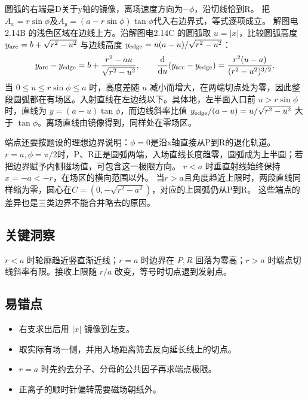 \documentclass[UTF8,fontset=fandol,a4paper,11pt]{ctexart}
\newcommand{\dd}{\mathop{}\!\mathrm{d}}
\begin{document}
圆弧的右端是D关于y轴的镜像，离场速度方向为$-\phi$，沿切线恰到R。
把$A_x=r\sin\phi$及$A_y=(a-r\sin\phi)\tan\phi$代入右边界式，等式逐项成立。
解图电2.14B 的浅色区域在边线上方。沿解图电2.14C 的圆弧取 $u=|x|$，比较圆弧高度 $y_{\rm arc}=b+\sqrt{r^2-u^2}$ 与边线高度 $y_{\rm edge}=u(a-u)/\sqrt{r^2-u^2}$：
\[
y_{\rm arc}-y_{\rm edge}=b+\frac{r^2-au}{\sqrt{r^2-u^2}},
\qquad
\frac{\dd}{\dd u}(y_{\rm arc}-y_{\rm edge})
=\frac{r^2(u-a)}{(r^2-u^2)^{3/2}}.
\]
当 $0\le u\le r\sin\phi\le a$ 时，高度差随 $u$ 减小而增大，在两端切点处为零，因此整段圆弧都在有场区。入射直线在左边线以下。具体地，左半面入口前 $u>r\sin\phi$ 时，直线为 $y=(a-u)\tan\phi$，而边线斜率比值 $y_{\rm edge}/(a-u)=u/\sqrt{r^2-u^2}$ 大于 $\tan\phi$。离场直线由镜像得到，同样处在零场区。

端点还要按题设的理想边界说明：$\phi=0$是沿x轴直接从P到R的退化轨道。
$r=a,\phi=\pi/2$时，P、R正是圆弧两端，入场直线长度趋零，圆弧成为上半圆；若把边界赋予内侧磁场值，可包含这一极限方向。
$r<a$ 时垂直射线始终保持 $x=-a<-r$，在场区的横向范围以外。
当$r>a$且角度趋近上限时，两段直线同样缩为零，圆心在$C=(0,-\sqrt{r^2-a^2})$，对应的上圆弧仍从P到R。
这些端点的差异也是三类边界不能合并略去的原因。




\subsection*{关键洞察}

$r<a$ 时轮廓趋近竖直渐近线；$r=a$ 时边界在 $P,R$ 回落为零高；$r>a$ 时端点切线斜率有限。接收上限随 $r/a$ 改变，等号时切点退到发射点。



\subsection*{易错点}

\begin{itemize}
\item 右支求出后用 $|x|$ 镜像到左支。
\item 取实际有场一侧，并用入场距离筛去反向延长线上的切点。
\item $r=a$ 时先约去分子、分母的公共因子再求端点极限。
\item 正离子的顺时针偏转需要磁场朝纸外。
\end{itemize}
\end{document}
